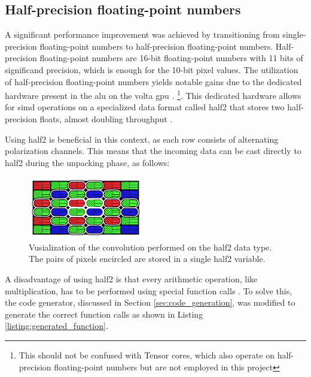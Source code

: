 \subsection{Half-precision floating-point numbers}
\label{sec:half2}
A significant performance improvement was achieved by transitioning from single-precision floating-point numbers to half-precision floating-point numbers.
Half-precision floating-point numbers are 16-bit floating-point numbers with 11 bits of significand precision, which is enough for the 10-bit pixel values.
The utilization of half-precision floating-point numbers yields notable gains due to the dedicated hardware present in the \gls{alu} on the \gls{volta} \gls{gpu} \cite{CUDA2023}.
\footnote{This should not be confused with Tensor cores, which also operate on half-precision floating-point numbers but are not employed in this project}.
This dedicated hardware allows for \gls{simd} operations on a specialized data format called \gls{half2} that stores two half-precision floats, almost doubling throughput \cite{nvidiaHalf2ArithmeticFunctions2023}\cite{hoExploitingHalfPrecision2017}.

Using \gls{half2} is beneficial in this context, as each row consists of alternating polarization channels.
This means that the incoming data can be cast directly to \gls{half2} during the unpacking phase, as follows:



\begin{figure}[H]
    \centering
    \includegraphics[width=0.45\textwidth]{figures/polarized_image/half2_conv.pdf}
    \caption{Vusialization of the convolution performed on the \gls{half2} data type. The pairs of pixels encircled are stored in a single \gls{half2} variable.}
    \label{fig:half2_conv}
\end{figure}

A disadvantage of using \gls{half2} is that every arithmetic operation, like multiplication, has to be performed using special function calls \cite{nvidiaHalf2ArithmeticFunctions2023}.
To solve this, the code generator, discussed in Section \ref{sec:code_generation}, was modified to generate the correct function calls as shown in Listing \ref{listing:generated_function}.


